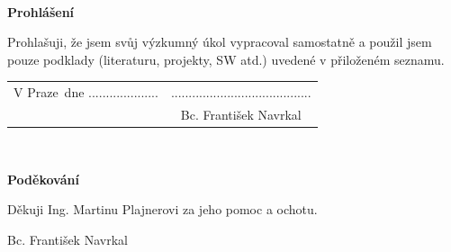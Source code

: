 \documentclass[a4paper,twoside,12pt]{book}
\newcommand{\tb}{\textbf} %
\newcommand{\woman}{} %
\newcommand{\autor}{Bc. František Navrkal}   %
\newcommand{\kde}{Praze} %
\newcommand{\prohlaseni}{Prohlašuji, že jsem svůj výzkumný úkol vypracoval\woman{} samostatně a použil\woman{} jsem pouze podklady (literaturu, projekty, SW atd.) uvedené v přiloženém seznamu.} %
\newcommand{\podekovani}{Děkuji Ing. Martinu Plajnerovi za jeho pomoc a ochotu.} %
\begin{document}
\newpage %
\thispagestyle{empty}  %

~ %
\vfill %

\tb{Prohlášení} %

\vspace{1em} %
\prohlaseni

\vspace{2em}  %
\hspace{-0.5em}\begin{tabularx}{\textwidth}{X c}  %
V \kde\ dne .................... &........................................ \\	%
	& \autor
\end{tabularx}	%


\newpage
\thispagestyle{empty}

~
\vfill %


\tb{Poděkování}

\vspace{1em} %
\podekovani
\begin{flushright}
\autor
\end{flushright}  %
\end{document}
